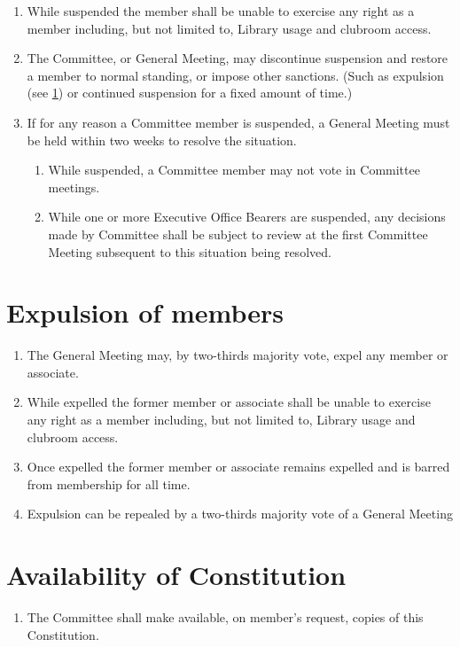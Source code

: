 \documentclass[a4paper]{article}
\begin{document}
\begin{enumerate}
    \item While suspended the member shall be unable to exercise any right as a member including, but not limited to, Library usage and clubroom access.
    \item The Committee, or General Meeting, may discontinue suspension and restore a member to normal standing, or impose other sanctions. (Such as expulsion (see \cref{sec:expulsion}) or continued suspension for a fixed amount of time.)
    \item \label{todo_enu_CM_suspend} If for any reason a Committee member is suspended, a General Meeting must be held within two weeks to resolve the situation.
          \begin{enumerate}
              \item \label{todo_enu_CM_Suspend_No_Vote} While suspended, a Committee member may not vote in Committee meetings.
              \item While one or more Executive Office Bearers are suspended, any decisions made by Committee shall be subject to review at the first Committee Meeting subsequent to this situation being resolved.
          \end{enumerate}
\end{enumerate}


\section{Expulsion of members} \label{sec:expulsion}
\begin{enumerate}
    \item The General Meeting may, by two-thirds majority vote, expel any member or associate.
    \item While expelled the former member or associate shall be unable to exercise any right as a member including, but not limited to, Library usage and clubroom access.
    \item \label{todo_subsec_Expelled_no_membership} Once expelled the former member or associate remains expelled and is barred from membership for all time.
    \item Expulsion can be repealed by a two-thirds majority vote of a General Meeting
\end{enumerate}


\section{Availability of Constitution} \label{sec:availability}
\begin{enumerate}
    \item The Committee shall make available, on member's request, copies of this Constitution.
\end{enumerate}
\end{document}
